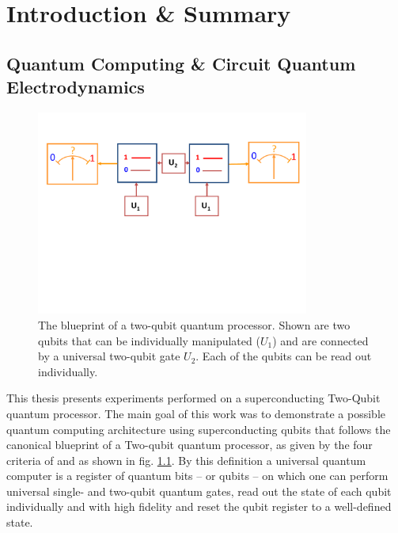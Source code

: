 \chapter{Introduction \& Summary}


\section{Quantum Computing \& Circuit Quantum Electrodynamics}

\begin{figure}
	\centering
		\includegraphics[width=0.8\textwidth]{./material/papers/grover/submission1/Fig1}
	\caption[Blueprint of a two-qubit quantum processor]{The blueprint of a two-qubit quantum processor. Shown are two qubits that can be individually manipulated ($U_1$) and are connected by a universal two-qubit gate $U_2$. Each of the qubits can be read out individually.}
	\label{fig:qubit_processor_blueprint}
\end{figure}

This thesis presents experiments performed on a superconducting Two-Qubit quantum processor. The main goal of this work was to demonstrate a possible quantum computing architecture using superconducting qubits that follows the canonical blueprint of a Two-qubit quantum processor, as given by the four criteria of \cite{divincenzo_physical_2000} and as shown in fig. \ref{fig:qubit_processor_blueprint}. By this definition a universal quantum computer is a register of quantum bits -- or qubits -- on which one can perform universal single- and two-qubit quantum gates, read out the state of each qubit individually and with high fidelity and reset the qubit register to a well-defined state.

